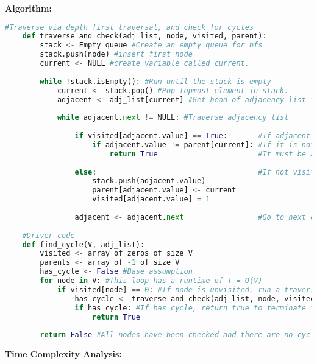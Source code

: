 \documentclass[10pt, a4paper]{article}
\begin{document}
\textbf{Algorithm:}
\begin{lstlisting}[language=Python,caption= Check cycle]
    #Traverse via depth first traversal, and check for cycles
    def traverse_and_check(adj_list, node, visited, parent):
        stack <- Empty queue #Create an empty queue for bfs
        stack.push(node) #insert first node
        current <- NULL #create variable called current.
        
        while !stack.isEmpty(): #Run until the stack is empty
            current <- stack.pop() #Pop topmost element in stack.
            adjacent <- adj_list[current] #Get head of adjacency list for current element
            
            while adjacent.next != NULL: #Traverse adjacency list
                
                if visited[adjacent.value] == True:       #If adjacent element already visited
                    if adjacent.value != parent[current]: #If it is not the parent of the current element
                        return True                       #It must be a cycle. Return true
                    
                else:                                     #If not visited, add to queue, make visited = 1, and assign current node as parent.
                    stack.push(adjacent.value)
                    parent[adjacent.value] <- current
                    visited[adjacent.value] = 1
                    
                adjacent <- adjacent.next                 #Go to next element in adjacency list
                     
    #Driver code 
    def find_cycle(V, adj_list):
        visited <- array of zeros of size V
        parents <- array of -1 of size V
        has_cycle <- False #Base assumption
        for node in V: #This loop has a runtime of T = O(V)
            if visited[node] == 0: #If node is unvisited, run a traverse and check on it.
                has_cycle <- traverse_and_check(adj_list, node, visited)
                if has_cycle: #If has cycle, return true to terminate the program.
                    return True
                
        return False #All nodes have been checked and there are no cycles. 
\end{lstlisting}

\textbf{Time Complexity Analysis:}
\end{document}
